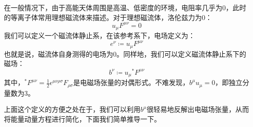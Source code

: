 \documentclass[lang=cn,color=blue,cm,11pt,scheme=chinese,bibend=bibtex,sorting=nty]{elegantbook}
\begin{document}
	\begin{note}
		在一般情况下，由于高能天体周围是高温、低密度的环境，电阻率几乎为0，此时的等离子体常用理想磁流体来描述。对于理想磁流体，洛伦兹力为0：
		\begin{equation}
			u_{\mu} F^{\mu \nu} = 0
		\end{equation}
		我们可以定义一个磁流体静止系，在该参考系下，电场定义为：
		\begin{equation}
			e^{\nu} \coloneqq u_{\mu} F^{\mu \nu}
		\end{equation}
		也就是说，磁流体自身测得的电场为0。同样地，我们可以定义磁流体静止系下的磁场：
		\begin{equation}
			b^{\nu} \coloneqq u_{\mu} {}^{*}F^{\mu \nu}
		\end{equation}
		其中，${}^{*}F^{\mu \nu} = \frac{1}{2} \epsilon^{\mu \nu \rho \sigma} F_{\rho \sigma}$是电磁场张量的对偶形式。不难发现，$b^{\mu} u_{\mu} = 0$，即独立分量数为3。
		
		上面这个定义的方便之处在于，我们可以利用$b^{\mu}$很轻易地反解出电磁场张量，从而将能量动量方程进行简化，下面我们简单推导一下。
		

\end{note}
\end{document}
